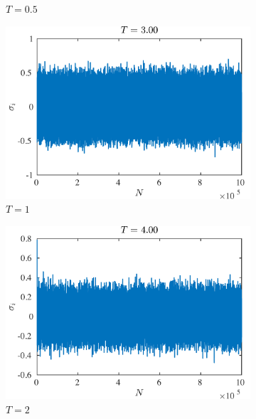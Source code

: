 \documentclass[12pt]{article}
\begin{document}
\begin{figure}
\begin{subfigure}[b]{0.49\textwidth}
		\caption{$T=0.5$}
	\end{subfigure}
	\begin{subfigure}[b]{0.49\textwidth}
		\centering
		\includegraphics[width=\textwidth]{2D/2D1e7/meansigT3.pdf}
		\caption{$T=1$}
	\end{subfigure}
	\hfill
	\begin{subfigure}[b]{0.49\textwidth}
		\centering
		\includegraphics[width=\textwidth]{2D/2D1e7/meansigT4.pdf}
		\caption{$T=2$}
	\end{subfigure}
	\begin{subfigure}[b]{0.49\textwidth}
		\centering

\end{subfigure}
\end{figure}
\end{document}
